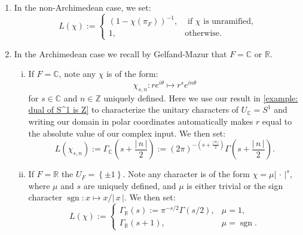\documentclass[11pt, x11names]{book}
\newcommand{\zz}{\mathbb{Z}}
\newcommand{\rr}{\mathbb{R}}
\newcommand{\cc}{\mathbb{C}}
\newcommand{\set}[1]{\left\{ #1 \right\}}
\renewcommand{\brack}[1]{\left(   #1 \right)}
\newcommand{\abs}[1]{\left| \, #1  \,\right|}
\DeclareMathOperator{\sgn}{sgn}
\newcommand{\inv}[1]{#1^{-1}}
\begin{document}
\begin{enumerate}[(1)]
    \item In the non-Archimedean case, we set:
    \begin{equation}
        \label{eqn: non-Arch local L-factor}
        L(\chi) := \begin{cases}
            \inv{\brack{1 - \chi(\pi_F)}}, & \text{ if } \chi \text{ is unramified,}\\
            1, & \text{otherwise}.
        \end{cases}
    \end{equation}
    \item In the Archimedean case we recall by Gelfand-Mazur that $F = \cc$ or $\rr$. 
    \begin{enumerate}[(i)]
        \item If $F = \cc$, note any $\chi$ is of the form:
        \begin{equation*}
            \chi_{s, n}: re^{i\theta} \mapsto r^s e^{i n \theta}
        \end{equation*}
         for $s \in \cc$ and $n \in \zz$ uniquely defined. Here we use our result in \ref{example: dual of S^1 is Z} to characterize the unitary characters of $U_\cc = S^1$ and writing our domain in polar coordinates automatically makes $r$ equal to the absolute value of our complex input. We then set:
         \begin{equation}
        \label{eqn: complex local L-factor}
            L(\chi_{s, n}) := \Gamma_\cc(s + \frac{\abs{n}}{2}) := \brack{2 \pi}^{-\brack{s + \frac{\abs{n}}{2}}}\Gamma(s + \frac{\abs{n}}{2}).
         \end{equation} 
         \item If $F = \rr$ the $U_F = \set{\pm 1}$. Note any character is of the form $\chi = \mu \abs{\cdot}^s$, where $\mu$ and $s$ are uniquely defined, and $\mu$ is either trivial or the sign character $\sgn: x \mapsto x/\abs{x}$. We then set:
         \begin{equation}
        \label{eqn: real local L-factor}
             L(\chi) := \begin{cases}
                 \Gamma_\rr(s) := \pi^{-s/2}\Gamma(s/2), & \mu = 1,\\
                 \Gamma_\rr(s+1), & \mu = \sgn.
             \end{cases}
         \end{equation}
    \end{enumerate}
\end{enumerate}
\end{document}
